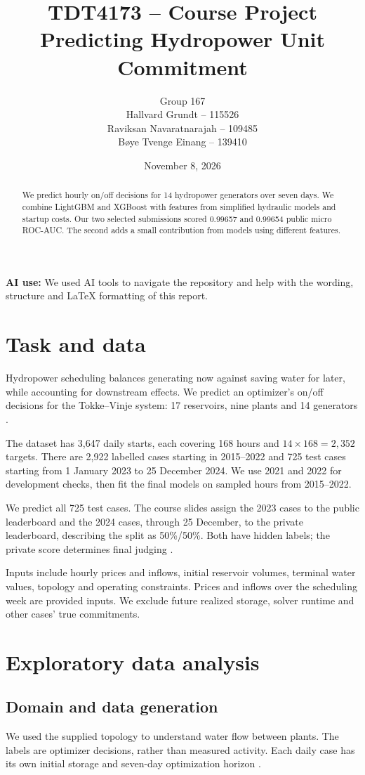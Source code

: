 \documentclass[a4paper,11pt]{article}
\title{TDT4173 -- Course Project\\[5pt]\large Predicting Hydropower Unit Commitment}
\author{Group 167\\[5pt]
\normalsize Hallvard Grundt -- 115526\\
\normalsize Raviksan Navaratnarajah -- 109485\\
\normalsize B\o{}ye Tvenge Einang -- 139410}
\date{November 8, 2026}
\begin{document}
\maketitle

\textbf{AI use:} We used AI tools to navigate the repository and help with the wording, structure and LaTeX formatting of this report.

\begin{abstract}
We predict hourly on/off decisions for 14 hydropower generators over seven days. We combine LightGBM and XGBoost with features from simplified hydraulic models and startup costs. Our two selected submissions scored 0.99657 and 0.99654 public micro ROC-AUC. The second adds a small contribution from models using different features.
\end{abstract}

\section{Task and data}
Hydropower scheduling balances generating now against saving water for later, while accounting for downstream effects. We predict an optimizer's on/off decisions for the Tokke--Vinje system: 17 reservoirs, nine plants and 14 generators \cite{task,data}.

The dataset has 3,647 daily starts, each covering 168 hours and $14\times168=2,352$ targets. There are 2,922 labelled cases starting in 2015--2022 and 725 test cases starting from 1 January 2023 to 25 December 2024. We use 2021 and 2022 for development checks, then fit the final models on sampled hours from 2015--2022.

We predict all 725 test cases. The course slides assign the 2023 cases to the public leaderboard and the 2024 cases, through 25 December, to the private leaderboard, describing the split as 50\%/50\%. Both have hidden labels; the private score determines final judging \cite{slides,grading}.

Inputs include hourly prices and inflows, initial reservoir volumes, terminal water values, topology and operating constraints. Prices and inflows over the scheduling week are provided inputs. We exclude future realized storage, solver runtime and other cases' true commitments.

\section{Exploratory data analysis}
\subsection*{Domain and data generation}
We used the supplied topology to understand water flow between plants. The labels are optimizer decisions, rather than measured activity. Each daily case has its own initial storage and seven-day optimization horizon \cite{task,data}.
\end{document}
